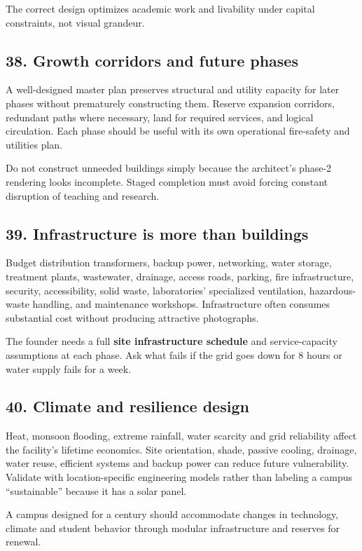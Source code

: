 The correct design optimizes academic work and livability under capital constraints, not visual grandeur.


\subsection{38. Growth corridors and future phases}

A well-designed master plan preserves structural and utility capacity for later phases without prematurely constructing them. Reserve expansion corridors, redundant paths where necessary, land for required services, and logical circulation. Each phase should be useful with its own operational fire-safety and utilities plan.

Do not construct unneeded buildings simply because the architect's phase-2 rendering looks incomplete. Staged completion must avoid forcing constant disruption of teaching and research.


\subsection{39. Infrastructure is more than buildings}

Budget distribution transformers, backup power, networking, water storage, treatment plants, wastewater, drainage, access roads, parking, fire infrastructure, security, accessibility, solid waste, laboratories' specialized ventilation, hazardous-waste handling, and maintenance workshops. Infrastructure often consumes substantial cost without producing attractive photographs.

The founder needs a full \textbf{site infrastructure schedule} and service-capacity assumptions at each phase. Ask what fails if the grid goes down for 8 hours or water supply fails for a week.


\subsection{40. Climate and resilience design}

Heat, monsoon flooding, extreme rainfall, water scarcity and grid reliability affect the facility's lifetime economics. Site orientation, shade, passive cooling, drainage, water reuse, efficient systems and backup power can reduce future vulnerability. Validate with location-specific engineering models rather than labeling a campus ``sustainable'' because it has a solar panel.

A campus designed for a century should accommodate changes in technology, climate and student behavior through modular infrastructure and reserves for renewal.


